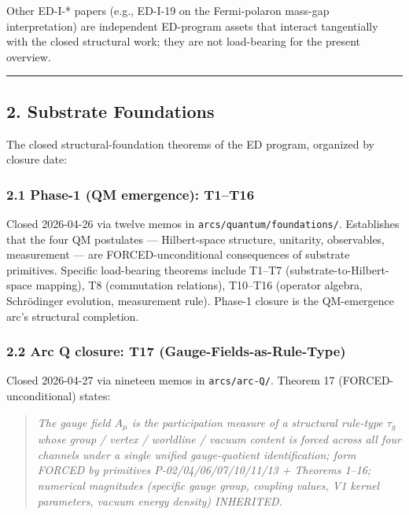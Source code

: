 \documentclass[
  11pt,a4paper]{article}
\begin{document}
Other ED-I-* papers (e.g., ED-I-19 on the Fermi-polaron mass-gap
interpretation) are independent ED-program assets that interact
tangentially with the closed structural work; they are not load-bearing
for the present overview.

\begin{center}\rule{0.5\linewidth}{0.5pt}\end{center}

\subsection{2. Substrate Foundations}\label{substrate-foundations}

The closed structural-foundation theorems of the ED program, organized
by closure date:

\subsubsection{2.1 Phase-1 (QM emergence):
T1--T16}\label{phase-1-qm-emergence-t1t16}

Closed 2026-04-26 via twelve memos in
\texttt{arcs/quantum/foundations/}. Establishes that the four QM
postulates --- Hilbert-space structure, unitarity, observables,
measurement --- are FORCED-unconditional consequences of substrate
primitives. Specific load-bearing theorems include T1--T7
(substrate-to-Hilbert-space mapping), T8 (commutation relations),
T10--T16 (operator algebra, Schrödinger evolution, measurement rule).
Phase-1 closure is the QM-emergence arc's structural completion.

\subsubsection{2.2 Arc Q closure: T17
(Gauge-Fields-as-Rule-Type)}\label{arc-q-closure-t17-gauge-fields-as-rule-type}

Closed 2026-04-27 via nineteen memos in \texttt{arcs/arc-Q/}. Theorem 17
(FORCED-unconditional) states:

\begin{quote}
\emph{The gauge field \(A_\mu\) is the participation measure of a
structural rule-type \(\tau_g\) whose group / vertex / worldline /
vacuum content is forced across all four channels under a single unified
gauge-quotient identification; form FORCED by primitives
P-02/04/06/07/10/11/13 + Theorems 1--16; numerical magnitudes (specific
gauge group, coupling values, V1 kernel parameters, vacuum energy
density) INHERITED.}
\end{quote}
\end{document}
